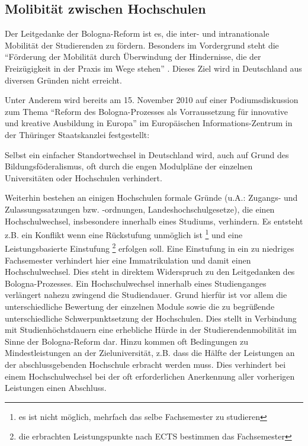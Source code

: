 
\subsection*{Molibität zwischen Hochschulen}

Der Leitgedanke der Bologna-Reform ist es, die inter- und intranationale
Mobilität der Studierenden zu fördern. Besonders im Vordergrund steht die
"`Förderung der Mobilität durch Überwindung der Hindernisse, die der
Freizügigkeit in der Praxis im Wege stehen"' \cite{bologna}.  Dieses Ziel wird in
Deutschland aus diversen Gründen nicht erreicht.

Unter Anderem wird bereits am 15. November 2010 auf einer
Podiumsdiskussion zum Thema "`Reform des Bologna-Prozesses als Vorraussetzung
für innovative und kreative Ausbildung in Europa"'\cite{tsk2011} im Europäischen
Informations-Zentrum in der Thüringer Staatskanzlei festgestellt:
\begin{displayquote}
 Selbst ein einfacher Standortwechsel in Deutschland wird, auch auf Grund des
 Bildungsföderalismus, oft durch die engen Modulpläne der einzelnen
 Universitäten oder Hochschulen verhindert.
\end{displayquote}
Weiterhin bestehen an einigen Hochschulen formale Gründe (u.A.: Zugangs- und
Zulassungssatzungen bzw. -ordnungen, Landeshochschulgesetze), die einen
Hochschulwechsel, insbesondere innerhalb eines Studiums, verhindern. Es entsteht
z.B. ein Konflikt wenn eine Rückstufung unmöglich ist \footnote{es ist nicht
möglich, mehrfach das selbe Fachsemester zu studieren} und eine
Leistungsbasierte Einstufung \footnote{die erbrachten Leistungspunkte nach ECTS
bestimmen das Fachsemester} erfolgen soll. Eine Einstufung in ein zu niedriges
Fachsemester verhindert hier eine Immatrikulation und damit einen
Hochschulwechsel. Dies steht in direktem Widerspruch zu den Leitgedanken des
Bologna-Prozesses.
Ein Hochschulwechsel innerhalb eines Studienganges verlängert nahezu zwingend
die Studiendauer. Grund hierfür ist vor allem die unterschiedliche Bewertung der
einzelnen Module sowie die zu begrüßende unterschiedliche Schwerpunktsetzung der
Hochschulen. Dies stellt in Verbindung mit Studienhöchstdauern eine erhebliche
Hürde in der Studierendenmobilität im Sinne der Bologna-Reform dar.
\newpage
Hinzu kommen oft Bedingungen zu Mindestleistungen an der Zieluniversität, z.B.
dass die Hälfte der Leistungen an der abschlussgebenden Hochschule erbracht
werden muss. Dies verhindert bei einem Hochschulwechsel bei der oft
erforderlichen Anerkennung aller vorherigen Leistungen einen Abschluss.

